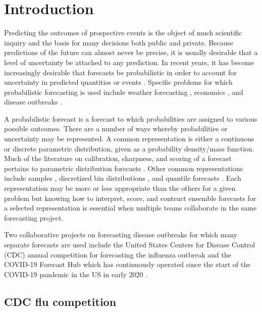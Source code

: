 \documentclass[11pt,notitlepage]{isuthesis}
\begin{document}
\chapter{Introduction}

Predicting the outcomes of prospective events is the object of much scientific
inquiry and the basis for many decisions both public and private. Because 
predictions of the future can almost never be precise, it is usually desirable
that a level of uncertainty be attached to any prediction. In recent years, it
has become increasingly desirable that forecasts be probabilistic in order to 
account for uncertainty in predicted quantities or events 
\cite[]{gneiting2014probabilistic}. Specific problems for 
which probabilistic forecasting is used include weather forecasting
\cite[]{baran2018combining}, economics \cite[]{groen2013real}, and disease outbreaks
\cite[]{yamana2016superensemble}.

A probabilistic forecast is a forecast to which probabilities are assigned to 
various possible outcomes. There are a number of ways whereby probabilities or 
uncertainty may be represented. A common representation is either a continuous 
or
discrete parametric distribution, given as a probability density/mass function. 
Much of the literature 
on calibration, sharpness, and scoring of a forecast pertains to parametric 
distribution forecasts
\cite[]{gneiting2007probabilistic,gneiting2013combining,baran2018combining}.
Other common representations include samples \cite[]{krueger2016probabilistic}, 
discretized bin distributions \cite[]{mcgowan2019collaborative},
and quantile forecasts \cite[]{taylor2021evaluating, bracher2021evaluating}. 
Each representation may be more or less 
appropriate than the others for a given problem but knowing how to interpret, 
score, and contruct ensemble forecasts for a selected representation is 
essential when multiple teams collaborate in the same forecasting project.


Two collaborative projects on forecasting disease outbreaks for which many 
separate forecasts 
are used include the United States Centers for Disease Control (CDC)
annual competition for forecasting the influenza outbreak \cite[]{cdcflusight}
and the COVID-19 Forecast Hub which has 
continuously operated since the start of the COVID-19 pandemic in the US in 
early 2020 \cite[]{Cramer2021-hub-dataset}.

\section{CDC flu competition}
\end{document}
